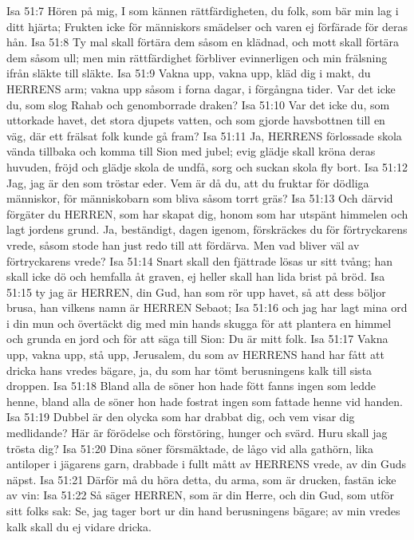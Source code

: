 Isa 51:7  Hören på mig, I som kännen rättfärdigheten, du folk, som bär min lag i ditt hjärta; Frukten icke för människors smädelser och varen ej förfärade för deras hån.
Isa 51:8  Ty mal skall förtära dem såsom en klädnad, och mott skall förtära dem såsom ull; men min rättfärdighet förbliver evinnerligen och min frälsning ifrån släkte till släkte.
Isa 51:9  Vakna upp, vakna upp, kläd dig i makt, du HERRENS arm; vakna upp såsom i forna dagar, i förgångna tider. Var det icke du, som slog Rahab och genomborrade draken?
Isa 51:10  Var det icke du, som uttorkade havet, det stora djupets vatten, och som gjorde havsbottnen till en väg, där ett frälsat folk kunde gå fram?
Isa 51:11  Ja, HERRENS förlossade skola vända tillbaka och komma till Sion med jubel; evig glädje skall kröna deras huvuden, fröjd och glädje skola de undfå, sorg och suckan skola fly bort.
Isa 51:12  Jag, jag är den som tröstar eder. Vem är då du, att du fruktar för dödliga människor, för människobarn som bliva såsom torrt gräs?
Isa 51:13  Och därvid förgäter du HERREN, som har skapat dig, honom som har utspänt himmelen och lagt jordens grund. Ja, beständigt, dagen igenom, förskräckes du för förtryckarens vrede, såsom stode han just redo till att fördärva. Men vad bliver väl av förtryckarens vrede?
Isa 51:14  Snart skall den fjättrade lösas ur sitt tvång; han skall icke dö och hemfalla åt graven, ej heller skall han lida brist på bröd.
Isa 51:15  ty jag är HERREN, din Gud, han som rör upp havet, så att dess böljor brusa, han vilkens namn är HERREN Sebaot;
Isa 51:16  och jag har lagt mina ord i din mun och övertäckt dig med min hands skugga för att plantera en himmel och grunda en jord och för att säga till Sion: Du är mitt folk.
Isa 51:17  Vakna upp, vakna upp, stå upp, Jerusalem, du som av HERRENS hand har fått att dricka hans vredes bägare, ja, du som har tömt berusningens kalk till sista droppen.
Isa 51:18  Bland alla de söner hon hade fött fanns ingen som ledde henne, bland alla de söner hon hade fostrat ingen som fattade henne vid handen.
Isa 51:19  Dubbel är den olycka som har drabbat dig, och vem visar dig medlidande? Här är förödelse och förstöring, hunger och svärd. Huru skall jag trösta dig?
Isa 51:20  Dina söner försmäktade, de lågo vid alla gathörn, lika antiloper i jägarens garn, drabbade i fullt mått av HERRENS vrede, av din Guds näpst.
Isa 51:21  Därför må du höra detta, du arma, som är drucken, fastän icke av vin:
Isa 51:22  Så säger HERREN, som är din Herre, och din Gud, som utför sitt folks sak: Se, jag tager bort ur din hand berusningens bägare; av min vredes kalk skall du ej vidare dricka.
